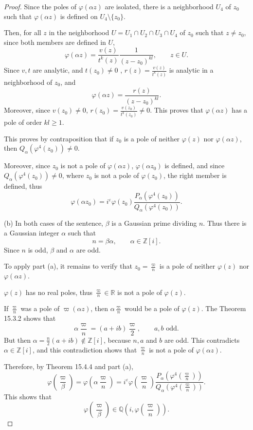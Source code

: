 \documentclass[11pt,a4paper]{article}
\newcommand{\Q}{\mathbb{Q}}
\newcommand{\Z}{\mathbb{Z}}
\newcommand{\R}{\mathbb{R}}
\begin{document}
\begin{proof}
Since the poles of $\varphi(\alpha z)$ are isolated, there is a neighborhood $U_4$ of $z_0$ such that $\varphi(\alpha z)$ is defined on $U_4 \setminus\{z_0\}$.

Then, for all $z$ in the neighborhood $U = U_1 \cap U_2 \cap U_3 \cap U_4$ of $z_0$ such that $z\ne z_0$, since both members are defined in $U$, 
$$
\varphi(\alpha z) = \frac{v(z)}{t^k(z)} \frac{1}{(z-z_0)^{kl}}, \qquad z \in U.
$$
Since $v,t$ are analytic, and $t(z_0)\ne 0$ , $r(z) = \frac{v(z)}{t^k(z)}$ is analytic in a neighborhood of $z_0$, and
$$\varphi(\alpha z) = \frac{r(z)}{(z-z_0)^{kl}}.$$
Moreover, since $v(z_0) \ne 0$, $r(z_0) =  \frac{v(z_0)}{t^k(z_0)} \ne 0$. This proves that $\varphi(\alpha z)$ has a pole of order $kl \geq 1$.

This proves by contraposition that if $z_0$ is a pole of neither $\varphi(z)$ nor $\varphi(\alpha z)$, then $Q_\alpha(\varphi^4(z_0))\ne 0$.

Moreover, since $z_0$ is not a pole of $\varphi(\alpha z)$, $\varphi(\alpha z_0)$ is defined, and since $Q_\alpha(\varphi^4(z_0)) \ne 0$, where $z_0$ is not a pole of $\varphi(z_0)$, the right member is defined, thus
$$
\varphi(\alpha z_0) = i^\varepsilon \varphi(z_0) \frac{P_\alpha(\varphi^4(z_0))}{Q_\alpha(\varphi^4(z_0))}.
$$

\item[(b)] In both cases of the sentence, $\beta$ is a Gaussian prime dividing $n$. Thus there is a Gaussian integer $\alpha$ such that 
$$n = \beta \alpha, \qquad \alpha \in \Z[i].$$
Since $n$ is odd, $\beta$ and $\alpha$ are odd. 

To apply part (a), it remains to verify that $z_0 = \frac{\varpi}{n}$ is a pole of neither $\varphi(z)$ nor $\varphi(\alpha z)$.

$\varphi(z)$ has no real poles, thus $ \frac{\varpi}{n} \in \R$ is not a pole of $\varphi(z)$.

If $\frac{\varpi}{n}$ was a pole of $\varpi(\alpha z)$, then $\alpha \frac{\varpi}{n}$ would be a pole of $\varphi(z)$. The Theorem 15.3.2 shows that
$$\alpha \frac{\varpi}{n} = (a+ib) \frac{\varpi}{2}, \qquad a,b \text{ odd}.$$
But then $\alpha = \frac{n}{2}(a+ib) \not \in \Z[i]$, because $n,a$ and $b$ are odd. This contradicts $\alpha \in \Z[i]$, and this contradiction shows that $\frac{\varpi}{n}$ is not a pole of $\varphi(\alpha z)$.

Therefore, by Theorem 15.4.4 and part (a),
$$\varphi\left(\frac{\varpi}{\beta} \right) = \varphi\left(\alpha \frac {\varpi}{n} \right) = i^\varepsilon \varphi\left(\frac{\varpi}{n}\right) \frac{P_\alpha\left(\varphi^4\left(\frac{\varpi}{n}\right)\right)}{Q_\alpha\left(\varphi^4\left(\frac{\varpi}{n}\right)\right)}.
$$
This shows that $$\varphi\left(\frac{\varpi}{\beta} \right) \in \Q\left(i,\varphi\left( \frac{\varpi}{n}\right)\right).$$


\end{proof}
\end{document}
